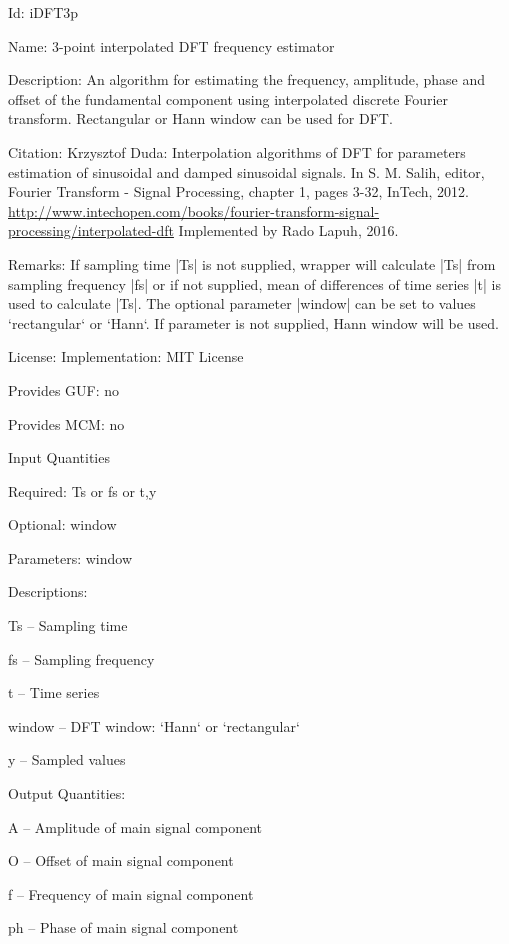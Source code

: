 \begin{tightdesc}
\item [Id:] iDFT3p
\item [Name:] 3-point interpolated DFT frequency estimator
\item [Description:] An algorithm for estimating the frequency, amplitude, phase and offset of the fundamental component using interpolated discrete Fourier transform. Rectangular or Hann window can be used for DFT.
\item [Citation:] Krzysztof Duda: Interpolation algorithms of DFT for parameters estimation of sinusoidal and damped sinusoidal signals. In S. M. Salih, editor, Fourier Transform - Signal Processing, chapter 1, pages 3-32, InTech, 2012. \url{http://www.intechopen.com/books/fourier-transform-signal-processing/interpolated-dft} Implemented by Rado Lapuh, 2016.
\item [Remarks:] If sampling time |Ts| is not supplied, wrapper will calculate |Ts| from sampling frequency |fs| or if not supplied, mean of differences of time series |t| is used to calculate |Ts|. The optional parameter |window| can be set to values `rectangular` or `Hann`. If parameter is not supplied, Hann window will be used.
\item [License:] Implementation: MIT License
\item [Provides GUF:] no
\item [Provides MCM:] no
\item [Input Quantities] \rule{0em}{0em}
    \begin{tightdesc}
    \item [Required:] 
        \textsf{Ts} or \textsf{fs} or \textsf{t},\enspace \textsf{y}
    \item [Optional:] 
        \textsf{window}
    \item [Parameters:] 
        \textsf{window}
    \item [Descriptions:] \rule{0em}{0em}
        \begin{tightdesc}
            \item[\textsf{Ts}] -- Sampling time
            \item[\textsf{fs}] -- Sampling frequency
            \item[\textsf{t}] -- Time series
            \item[\textsf{window}] -- DFT window: `Hann` or `rectangular`
            \item[\textsf{y}] -- Sampled values
        \end{tightdesc}
    \end{tightdesc}
\item [Output Quantities:] \rule{0em}{0em}
    \begin{tightdesc}
        \item[\textsf{A}] -- Amplitude of main signal component
        \item[\textsf{O}] -- Offset of main signal component
        \item[\textsf{f}] -- Frequency of main signal component
        \item[\textsf{ph}] -- Phase of main signal component
    \end{tightdesc}
\end{tightdesc}
